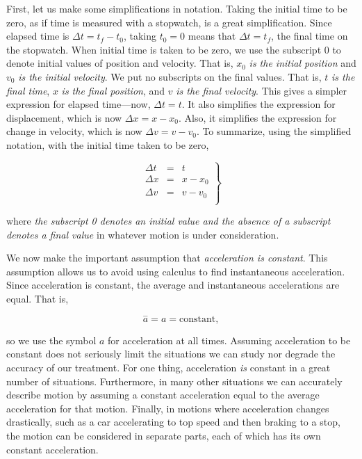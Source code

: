 \documentclass[
]{book}
\begin{document}
First, let us make some simplifications in notation. Taking the initial
time to be zero, as if time is measured with a stopwatch, is a great
simplification. Since elapsed time is \({\Delta t = {t_{f} - t_{0}}}{}\),
taking \({t_{0} = 0}{}\) means that \({\Delta t = t_{f}}{}\), the final time
on the stopwatch. When initial time is taken to be zero, we use the
subscript 0 to denote initial values of position and velocity. That is,
\(x_{0}\) \emph{is the initial position} and \(v_{0}{}\) \emph{is the initial
velocity}. We put no subscripts on the final values. That is, \(t\) \emph{is
the final time}, \(x{}\) \emph{is the final position}, and \(v\) \emph{is the final
velocity}. This gives a simpler expression for elapsed time---now,
\({\Delta t = t}{}\). It also simplifies the expression for displacement,
which is now \(\Delta x = {x - x_{0}}\). Also, it simplifies the
expression for change in velocity, which is now
\({\Delta v = {v - v_{0}}}{}\). To summarize, using the simplified
notation, with the initial time taken to be zero,

\leavevmode{}%
\[\left. \begin{array}{lll}
{\Delta t} & = & t \\
{\Delta x} & = & {x - x_{0}} \\
{\Delta v} & = & {v - v_{0}} \\
\end{array} \right\}\]

where \emph{the subscript 0 denotes an initial value and the absence of a
subscript denotes a final value} in whatever motion is under
consideration.

We now make the important assumption that \emph{acceleration is constant}.
This assumption allows us to avoid using calculus to find instantaneous
acceleration. Since acceleration is constant, the average and
instantaneous accelerations are equal. That is,

\leavevmode{}%
\[{{{\overset{-}{a} = a} = \text{constant}},}{}\]

so we use the symbol \(a{}\) for acceleration at all times. Assuming
acceleration to be constant does not seriously limit the situations we
can study nor degrade the accuracy of our treatment. For one thing,
acceleration \emph{is} constant in a great number of situations. Furthermore,
in many other situations we can accurately describe motion by assuming a
constant acceleration equal to the average acceleration for that motion.
Finally, in motions where acceleration changes drastically, such as a
car accelerating to top speed and then braking to a stop, the motion can
be considered in separate parts, each of which has its own constant
acceleration.
\end{document}
